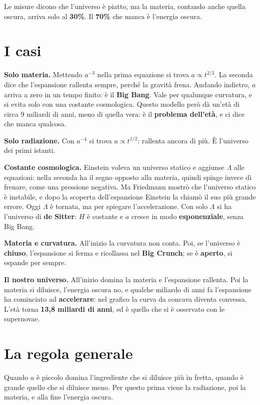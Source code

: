 \documentclass[12pt,a4paper]{article}
\begin{document}
Le misure dicono che l'universo è piatto, ma la materia, contando anche quella oscura, arriva solo al \textbf{30\%}. Il \textbf{70\%} che manca è l'energia oscura.

\section{I casi}
\textbf{Solo materia.} Mettendo $a^{-3}$ nella prima equazione si trova $a \propto t^{2/3}$. La seconda dice che l'espansione rallenta sempre, perché la gravità frena. Andando indietro, $a$ arriva a zero in un tempo finito: è il \textbf{Big Bang}. Vale per qualunque curvatura, e si evita solo con una costante cosmologica. Questo modello però dà un'età di circa 9 miliardi di anni, meno di quella vera: è il \textbf{problema dell'età}, e ci dice che manca qualcosa.

\textbf{Solo radiazione.} Con $a^{-4}$ si trova $a \propto t^{1/2}$: rallenta ancora di più. È l'universo dei primi istanti.

\textbf{Costante cosmologica.} Einstein voleva un universo statico e aggiunse $\Lambda$ alle equazioni: nella seconda ha il segno opposto alla materia, quindi spinge invece di frenare, come una pressione negativa. Ma Friedmann mostrò che l'universo statico è instabile, e dopo la scoperta dell'espansione Einstein la chiamò il suo più grande errore. Oggi $\Lambda$ è tornata, ma per spiegare l'accelerazione. Con solo $\Lambda$ si ha l'universo di \textbf{de Sitter}: $H$ è costante e $a$ cresce in modo \textbf{esponenziale}, senza Big Bang.

\textbf{Materia e curvatura.} All'inizio la curvatura non conta. Poi, se l'universo è \textbf{chiuso}, l'espansione si ferma e ricollassa nel \textbf{Big Crunch}; se è \textbf{aperto}, si espande per sempre.

\textbf{Il nostro universo.} All'inizio domina la materia e l'espansione rallenta. Poi la materia si diluisce, l'energia oscura no, e qualche miliardo di anni fa l'espansione ha cominciato ad \textbf{accelerare}: nel grafico la curva da concava diventa convessa. L'età torna \textbf{13,8 miliardi di anni}, ed è quello che si è osservato con le supernovae.

\section{La regola generale}
Quando $a$ è piccolo domina l'ingrediente che si diluisce più in fretta, quando è grande quello che si diluisce meno. Per questo prima viene la radiazione, poi la materia, e alla fine l'energia oscura.
\end{document}
